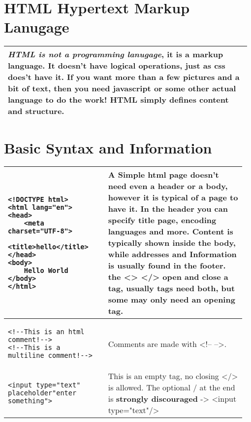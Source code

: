 \documentclass[main.tex,fontsize=8pt,paper=a4,paper=portrait,DIV=calc,]{scrartcl}
\begin{document}
\begin{table}[h!]
\section{HTML Hypertext Markup Lanugage}
\begin{tabular}{|m{0.975\linewidth}|}
\hline
\textbf{\emph{HTML is not a programming lanugage}}, it is a markup language. It doesn't have logical operations, just as css does't have it. If you want more than a few pictures and a bit of text, then you need javascript or some other actual language to do the work!\newline
HTML simply defines \textbf{content} and \textbf{structure}.\\
\hline
\end{tabular}
\section{Basic Syntax and Information}
\begin{tabular}{|m{0.4\linewidth}|m{0.555\linewidth}|}
\hline
\begin{lstlisting}
<!DOCTYPE html>
<html lang="en">
<head>
    <meta charset="UTF-8">
    <title>hello</title>
</head>
<body>
    Hello World
</body>
</html>
\end{lstlisting}
&
A Simple html page doesn't need even a header or a body, however it is typical of a page to have it.\newline
In the header you can specify title page, encoding languages and more.\newline
Content is typically shown inside the body, while addresses and Information is usually found in the footer.\newline
the <> </> open and close a tag, usually tags need both, but some may only need an opening tag.
\\
\hline
\begin{lstlisting}
<!--This is an html comment!-->
<!--This is a 
multiline comment!-->
\end{lstlisting}
&
Comments are made with <!-- -->.
\\
\hline
\begin{lstlisting}
<input type="text" placeholder"enter something">
\end{lstlisting}
&
This is an empty tag, no closing </> is allowed. \newline
The optional / at the end is \textbf{strongly discouraged} -> <input type="text"/>
\\

\end{tabular}
\end{table}
\end{document}
